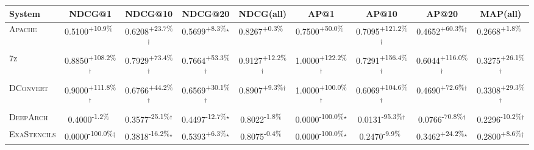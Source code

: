 \begin{table}[htbp]
\centering
\renewcommand{\arraystretch}{1.2}
\begin{tabular}{l|cccc|cccc}
\hline
System & NDCG@1 & NDCG@10 & NDCG@20 & NDCG(all) & AP@1 & AP@10 & AP@20 & MAP(all) \\ \hline
\textsc{Apache} & \cellcolor{green!30}0.5100\textsuperscript{+10.9\%}$^{\,\,\,}$ & \cellcolor{green!30}0.6208\textsuperscript{+23.7\%}$^\dagger$ & \cellcolor{green!30}0.5699\textsuperscript{+8.3\%}$^\star$ & \cellcolor{green!30}0.8267\textsuperscript{+0.3\%}$^{\,\,\,}$ & \cellcolor{green!30}0.7500\textsuperscript{+50.0\%}$^{\,\,\,}$ & \cellcolor{green!30}0.7095\textsuperscript{+121.2\%}$^\dagger$ & \cellcolor{green!30}0.4652\textsuperscript{+60.3\%}$^\dagger$ & \cellcolor{green!30}0.2668\textsuperscript{+1.8\%}$^{\,\,\,}$ \\
\textsc{7z} & \cellcolor{green!30}0.8850\textsuperscript{+108.2\%}$^\dagger$ & \cellcolor{green!30}0.7929\textsuperscript{+73.4\%}$^\dagger$ & \cellcolor{green!30}0.7664\textsuperscript{+53.3\%}$^\dagger$ & \cellcolor{green!30}0.9127\textsuperscript{+12.2\%}$^\dagger$ & \cellcolor{green!30}1.0000\textsuperscript{+122.2\%}$^\dagger$ & \cellcolor{green!30}0.7291\textsuperscript{+156.4\%}$^\dagger$ & \cellcolor{green!30}0.6044\textsuperscript{+116.0\%}$^\dagger$ & \cellcolor{green!30}0.3275\textsuperscript{+26.1\%}$^\dagger$ \\
\textsc{DConvert} & \cellcolor{green!30}0.9000\textsuperscript{+111.8\%}$^\dagger$ & \cellcolor{green!30}0.6766\textsuperscript{+44.2\%}$^\dagger$ & \cellcolor{green!30}0.6569\textsuperscript{+30.1\%}$^\dagger$ & \cellcolor{green!30}0.8907\textsuperscript{+9.3\%}$^\dagger$ & \cellcolor{green!30}1.0000\textsuperscript{+100.0\%}$^\dagger$ & \cellcolor{green!30}0.6069\textsuperscript{+104.6\%}$^\dagger$ & \cellcolor{green!30}0.4690\textsuperscript{+72.6\%}$^\dagger$ & \cellcolor{green!30}0.3308\textsuperscript{+29.3\%}$^\dagger$ \\
\textsc{DeepArch} & \cellcolor{red!30}0.4000\textsuperscript{-1.2\%}$^{\,\,\,}$ & \cellcolor{red!30}0.3577\textsuperscript{-25.1\%}$^\dagger$ & \cellcolor{red!30}0.4497\textsuperscript{-12.7\%}$^\star$ & \cellcolor{red!30}0.8022\textsuperscript{-1.8\%}$^{\,\,\,}$ & \cellcolor{red!30}0.0000\textsuperscript{-100.0\%}$^\star$ & \cellcolor{red!30}0.0131\textsuperscript{-95.3\%}$^\dagger$ & \cellcolor{red!30}0.0766\textsuperscript{-70.8\%}$^\dagger$ & \cellcolor{red!30}0.2296\textsuperscript{-10.2\%}$^\dagger$ \\
\textsc{ExaStencils} & \cellcolor{red!30}0.0000\textsuperscript{-100.0\%}$^\dagger$ & \cellcolor{red!30}0.3818\textsuperscript{-16.2\%}$^\star$ & \cellcolor{green!30}0.5393\textsuperscript{+6.3\%}$^\star$ & \cellcolor{red!30}0.8075\textsuperscript{-0.4\%}$^{\,\,\,}$ & \cellcolor{red!30}0.0000\textsuperscript{-100.0\%}$^\star$ & \cellcolor{red!30}0.2470\textsuperscript{-9.9\%}$^{\,\,\,}$ & \cellcolor{green!30}0.3462\textsuperscript{+24.2\%}$^\star$ & \cellcolor{green!30}0.2800\textsuperscript{+8.6\%}$^\dagger$ \\

\end{tabular}
\end{table}
